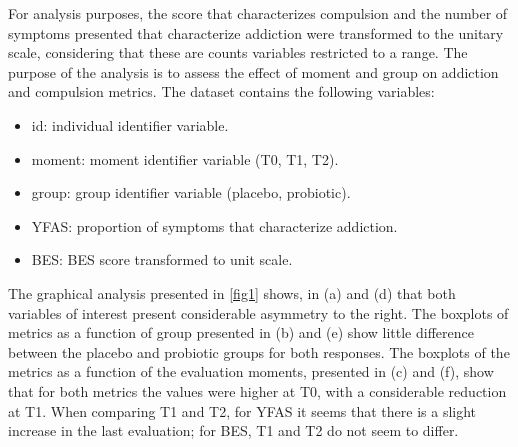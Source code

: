 \documentclass[AMA,STIX1COL]{WileyNJD-v2}
\begin{document}

For analysis purposes, the score that characterizes compulsion and the number of symptoms presented that characterize addiction were transformed to the unitary scale, considering that these are counts variables restricted to a range. The purpose of the analysis is to assess the effect of moment and group on addiction and compulsion metrics. The dataset contains the following variables:

\begin{itemize}
  \item id: individual identifier variable.
  \item moment: moment identifier variable (T0, T1, T2).
  \item group: group identifier variable (placebo, probiotic).
  \item YFAS: proportion of symptoms that characterize addiction.
  \item BES: BES score transformed to unit scale.
\end{itemize}


The graphical analysis presented in \autoref{fig1} shows, in (a) and (d) that both variables of interest present considerable asymmetry to the right. The boxplots of metrics as a function of group presented in (b) and (e) show little difference between the placebo and probiotic groups for both responses. The boxplots of the metrics as a function of the evaluation moments, presented in (c) and (f), show that for both metrics the values were higher at T0, with a considerable reduction at T1. When comparing T1 and T2, for YFAS it seems that there is a slight increase in the last evaluation; for BES, T1 and T2 do not seem to differ.  
\end{document}

